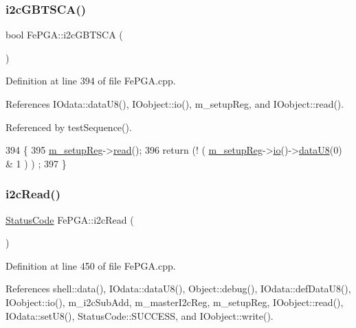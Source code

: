 \subsubsection{\texorpdfstring{i2c\+G\+B\+T\+S\+C\+A()}{i2cGBTSCA()}}
{\footnotesize\ttfamily bool Fe\+P\+G\+A\+::i2c\+G\+B\+T\+S\+CA (\begin{DoxyParamCaption}{ }\end{DoxyParamCaption})}



Definition at line 394 of file Fe\+P\+G\+A.\+cpp.



References I\+Odata\+::data\+U8(), I\+Oobject\+::io(), m\+\_\+setup\+Reg, and I\+Oobject\+::read().



Referenced by test\+Sequence().


\begin{DoxyCode}
394                       \{
395   \hyperlink{classFePGA_a0255fe229013986b4387c3a75ddf4e97}{m\_setupReg}->\hyperlink{classIOobject_aa07610c11963b1db6710e3c76ceea456}{read}();
396   \textcolor{keywordflow}{return} (! ( \hyperlink{classFePGA_a0255fe229013986b4387c3a75ddf4e97}{m\_setupReg}->\hyperlink{classIOobject_af04fb94137c3d86849f478ac5afab5d1}{io}()->\hyperlink{classIOdata_a75e9c318dbac3a39402179070943d4bc}{dataU8}(0) & 1 ) ) ;
397 \}
\end{DoxyCode}
\mbox{\label{classFePGA_a939c5c23077210a2ad851a12694657a4}} 
\subsubsection{\texorpdfstring{i2c\+Read()}{i2cRead()}\hspace{0.1cm}{\footnotesize\ttfamily [1/2]}}
{\footnotesize\ttfamily \hyperlink{classStatusCode}{Status\+Code} Fe\+P\+G\+A\+::i2c\+Read (\begin{DoxyParamCaption}{ }\end{DoxyParamCaption})}



Definition at line 450 of file Fe\+P\+G\+A.\+cpp.



References shell\+::data(), I\+Odata\+::data\+U8(), Object\+::debug(), I\+Odata\+::def\+Data\+U8(), I\+Oobject\+::io(), m\+\_\+i2c\+Sub\+Add, m\+\_\+master\+I2c\+Reg, m\+\_\+setup\+Reg, I\+Oobject\+::read(), I\+Odata\+::set\+U8(), Status\+Code\+::\+S\+U\+C\+C\+E\+SS, and I\+Oobject\+::write().



